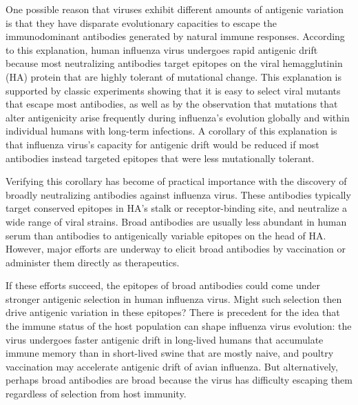\documentclass[11pt]{article}
\begin{document}
One possible reason that viruses exhibit different amounts of antigenic variation is that they have disparate evolutionary capacities to escape the immunodominant antibodies generated by natural immune responses\cite{lipsitch2007patterns,cobey2014pathogen,fulton2015mutational}.
According to this explanation, human influenza virus undergoes rapid antigenic drift because most neutralizing antibodies target epitopes on the viral hemagglutinin (HA) protein that are highly tolerant of mutational change.
This explanation is supported by classic experiments showing that it is easy to select viral mutants that escape most antibodies\cite{yewdell1979antigenic,webster1980determination}, as well as by the observation that mutations that alter antigenicity arise frequently during influenza's evolution globally\cite{koel2013substitutions,chambers2015identification,petrie2016antibodies,neher2016prediction,wen2016explaining} and within individual humans with long-term infections\cite{xue2017parallel}.
A corollary of this explanation is that influenza virus's capacity for antigenic drift would be reduced if most antibodies instead targeted epitopes that were less mutationally tolerant.

Verifying this corollary has become of practical importance with the discovery of broadly neutralizing antibodies against influenza virus.
These antibodies typically target conserved epitopes in HA's stalk\cite{sui2009structural,ekiert2009antibody,corti2011neutralizing} or receptor-binding site\cite{lee2012heterosubtypic,ekiert2012cross,schmidt2015viral}, and neutralize a wide range of viral strains.
Broad antibodies are usually less abundant in human serum than antibodies to antigenically variable epitopes on the head of HA\cite{ellebedy2014induction,andrews2015immune}.
However, major efforts are underway to elicit broad antibodies by vaccination or administer them directly as therapeutics\cite{krammer2015advances,corti2017tackling}.

If these efforts succeed, the epitopes of broad antibodies could come under stronger antigenic selection in human influenza virus.
Might such selection then drive antigenic variation in these epitopes?
There is precedent for the idea that the immune status of the host population can shape influenza virus evolution: the virus undergoes faster antigenic drift in long-lived humans that accumulate immune memory than in short-lived swine that are mostly naive\cite{sheerar1989antigenic,luoh1992hemagglutinin}, and poultry vaccination may accelerate antigenic drift of avian influenza\cite{lee2004effect,cattoli2011antigenic}.
But alternatively, perhaps broad antibodies are broad because the virus has difficulty escaping them regardless of selection from host immunity.
\end{document}
